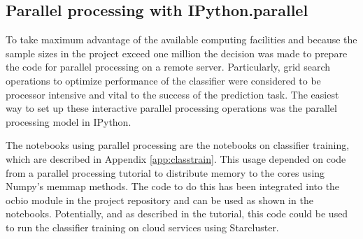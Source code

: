 \subsection{Parallel processing with IPython.parallel}

To take maximum advantage of the available computing facilities and because the sample sizes in the project exceed one million the decision was made to prepare the code for parallel processing on a remote server.
Particularly, grid search operations to optimize performance of the classifier were considered to be processor intensive and vital to the success of the prediction task.
The easiest way to set up these interactive parallel processing operations was the parallel processing model in IPython\autocite{parallel_python_webpage}.

The notebooks using parallel processing are the notebooks on classifier training, which are described in Appendix \ref{app:classtrain}.
This usage depended on code from a parallel processing tutorial\autocite{ogrisel_parallel} to distribute memory to the cores using Numpy's memmap methods.
The code to do this has been integrated into the ocbio module in the project repository and can be used as shown in the notebooks.
Potentially, and as described in the tutorial, this code could be used to run the classifier training on cloud services using Starcluster.
